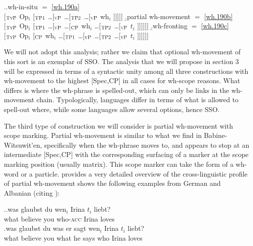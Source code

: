 \documentclass[charis]{glossa}
\begin{document}
\ex.\a.\label{wh.240a}wh-in-situ $=$ \ref{wh.190a}\\{}[$_{\textsc{TyP}}$ Op$_i$ [$_{\textsc{TP1}}$ \dots [$_{\textsc{vP}}$ \dots [$_{\textsc{TP2}}$ \dots [$_{\textsc{vP}}$ wh$_i$ ]]]]]\hspace{\fill}
   \b.\label{wh.240b}partial wh-movement $=$ \ref{wh.190b}\\{}[$_{\textsc{TyP}}$ Op$_i$ [$_{\textsc{TP1}}$ \dots [$_{\textsc{vP}}$ \dots [$_{\textsc{CP}}$ wh$_i$ \dots [$_{\textsc{TP2}}$ \dots [$_{\textsc{vP}}$ $t_i$ ]]]]]]\hspace{\fill}
   \b.\label{wh.240c}wh-fronting $=$ \ref{wh.190c}\\{}[$_{\textsc{TyP}}$ Op$_i$ [$_{\textsc{CP}}$ wh$_i$ \dots [$_{\textsc{TP1}}$ \dots [$_{\textsc{vP}}$ \dots [$_{\textsc{TP2}}$ \dots [$_{\textsc{vP}}$ $t_i$ ]]]]]]\hspace{\fill}\hspace{\fill}

We will not adopt this analysis; rather we claim that optional wh-movement of this sort is an exemplar of SSO. The analysis that we will propose in section 3 will be expressed in terms of a syntactic unity among all three constructions with wh-movement to the highest [Spec,CP] in all cases for wh-scope reasons. What differs is where the wh-phrase is spelled-out, which can only be links in the wh-movement chain. Typologically, languages differ in terms of what is allowed to spell-out where, while some languages allow several options, hence SSO.

The third type of construction we will consider is partial wh-movement with scope marking. Partial wh-movement is similar to what we find in Babine-Witsuwit'en, specifically when the wh-phrase moves to, and appears to stop at an intermediate [Spec,CP] with the corresponding surfacing of a marker at the scope marking position (usually matrix). This scope marker can take the form of a wh-word or a particle. \cite{fanselow:2006} provides a very detailed overview of the cross-linguistic profile of partial wh-movement shows the following examples from German and Albanian (citing \citealp{turano:1995}):

\ex.\label{wh.250}\ag.\label{wh.250a}was glaubst du wen$_i$ Irina $t_i$ liebt?\\
   what believe you who-\textsc{acc} Irina {} loves\\
   \bg.\label{wh.250b}was glaubst du was er sagt wen$_i$ Irina $t_i$ liebt?\\
   what believe you what he says who Irina loves\\
\end{document}
